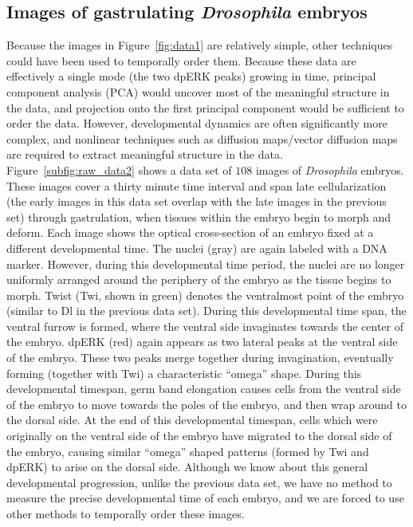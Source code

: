 \documentclass{pnastwo}
\begin{document}
\begin{article}
\subsection{Images of gastrulating {\it Drosophila} embryos}

Because the images in Figure~\ref{fig:data1} are relatively simple, other techniques could have been used to temporally order them. 
%
Because these data are effectively a single mode (the two dpERK peaks) growing in time,
principal component analysis (PCA) \cite{shlens2005tutorial} would uncover most of the meaningful structure in the data, and projection onto the first principal component would be sufficient to order the data.
%
However, developmental dynamics are often significantly more complex, and nonlinear techniques such as diffusion maps/vector diffusion maps are required to extract meaningful structure in the data. 
%
Figure~\ref{subfig:raw_data2} shows a data set of $108$ images of {\it Drosophila} embryos.
%
These images cover a thirty minute time interval and span late cellularization (the early images in this data set overlap with the late images in the previous set) through gastrulation, when tissues within the embryo begin to morph and deform. 
%
Each image shows the optical cross-section of an embryo fixed at a different developmental time.
%
The nuclei (gray) are again labeled with a DNA marker.
%
However, during this developmental time period, the nuclei are no longer uniformly arranged around the periphery of the embryo as the tissue begins to morph.
%
Twist (Twi, shown in green) denotes the ventralmost point of the embryo (similar to Dl in the previous data set).
%
During this developmental time span, the ventral furrow is formed, where the ventral side invaginates towards the center of the embryo.
%
dpERK (red) again appears as two lateral peaks at the ventral side of the embryo.
%
These two peaks merge together during invagination, eventually forming (together with Twi) a characteristic ``omega'' shape.
%
During this developmental timespan, germ band elongation causes cells from the ventral side of the embryo to move towards the poles of the embryo, and then wrap around to the dorsal side.
%
At the end of this developmental timespan, cells which were originally on the ventral side of the embryo have migrated to the dorsal side of the embryo, causing similar ``omega'' shaped patterns (formed by Twi and dpERK) to arise on the dorsal side.
%
Although we know about this general developmental progression, unlike the previous data set, we have no method to measure the precise developmental time of each embryo, 
and we are forced to use other methods to temporally order these images.


\end{article}
\end{document}
